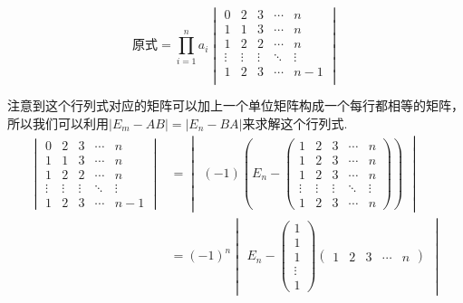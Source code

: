 \begin{solution}
    \[ \text{原式}=\prod_{i=1}^na_i \begin{vmatrix}
            0      & 2      & 3      & \cdots & n      \\
            1      & 1      & 3      & \cdots & n      \\
            1      & 2      & 2      & \cdots & n      \\
            \vdots & \vdots & \vdots & \ddots & \vdots \\
            1      & 2      & 3      & \cdots & n-1    \\
        \end{vmatrix} \]

    注意到这个行列式对应的矩阵可以加上一个单位矩阵构成一个每行都相等的矩阵，所以我们可以利用$|E_m-AB|=|E_n-BA|$来求解这个行列式.
    \begin{align*}
        \begin{vmatrix}
            0      & 2      & 3      & \cdots & n      \\
            1      & 1      & 3      & \cdots & n      \\
            1      & 2      & 2      & \cdots & n      \\
            \vdots & \vdots & \vdots & \ddots & \vdots \\
            1      & 2      & 3      & \cdots & n-1
        \end{vmatrix}
         & = \begin{vmatrix}(-1)\left(E_n-\begin{pmatrix}
                1      & 2      & 3      & \cdots & n      \\
                1      & 2      & 3      & \cdots & n      \\
                1      & 2      & 3      & \cdots & n      \\
                \vdots & \vdots & \vdots & \ddots & \vdots \\
                1      & 2      & 3      & \cdots & n
            \end{pmatrix}\right)\end{vmatrix} \\
         & =(-1)^n\begin{vmatrix}E_n-
                      \begin{pmatrix}
                1 \\1\\1\\\vdots\\1
            \end{pmatrix}\begin{pmatrix}1 & 2 & 3 & \cdots & n\end{pmatrix}\end{vmatrix}
    \end{align*}


\end{solution}
